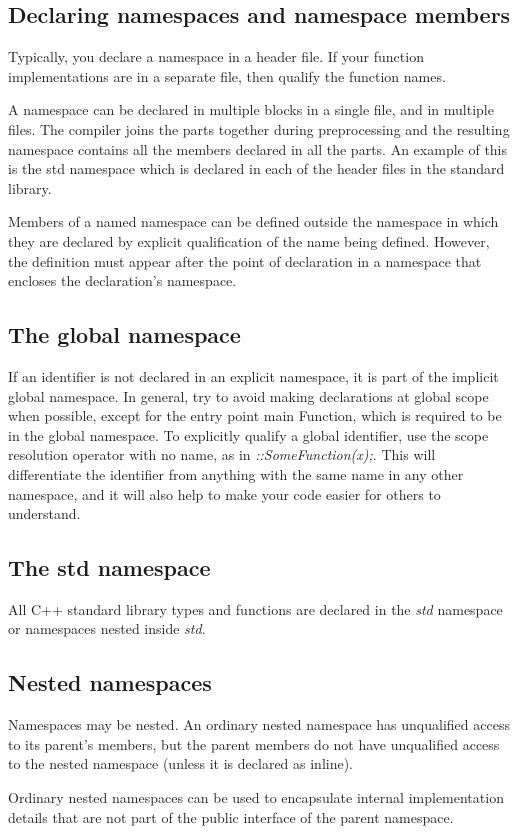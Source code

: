 \documentclass[a4paper]{report}
\begin{document}
\subsection{Declaring namespaces and namespace members}
Typically, you declare a namespace in a header file. If your function implementations are in a separate file, then qualify the function names.
\par
A namespace can be declared in multiple blocks in a single file, and in multiple files. The compiler joins the parts together during preprocessing and the resulting namespace contains all the members declared in all the parts. An example of this is the std namespace which is declared in each of the header files in the standard library.
\par
Members of a named namespace can be defined outside the namespace in which they are declared by explicit qualification of the name being defined. However, the definition must appear after the point of declaration in a namespace that encloses the declaration's namespace.
\subsection{The global namespace}
If an identifier is not declared in an explicit namespace, it is part of the implicit global namespace. In general, try to avoid making declarations at global scope when possible, except for the entry point main Function, which is required to be in the global namespace. To explicitly qualify a global identifier, use the scope resolution operator with no name, as in \emph{::SomeFunction(x);}. This will differentiate the identifier from anything with the same name in any other namespace, and it will also help to make your code easier for others to understand.
\subsection{The std namespace}
All C++ standard library types and functions are declared in the \emph{std} namespace or namespaces nested inside \emph{std}.
\subsection{Nested namespaces}
Namespaces may be nested. An ordinary nested namespace has unqualified access to its parent’s members, but the parent members do not have unqualified access to the nested namespace (unless it is declared as inline).
\par
Ordinary nested namespaces can be used to encapsulate internal implementation details that are not part of the public interface of the parent namespace.
\end{document}
